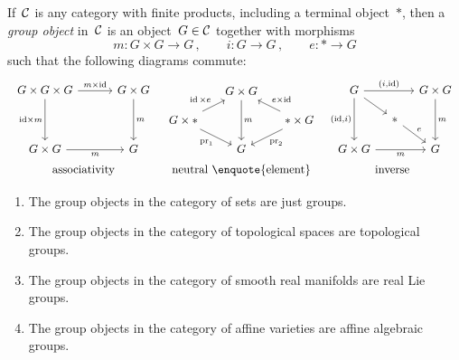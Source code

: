 \begin{remark}
  If~$\mathcal{C}$ is any category with finite products, including a terminal object~$\ast$, then a \emph{group object} in~$\mathcal{C}$ is an object~$G \in \mathcal{C}$ together with morphisms
  \[
    m \colon G \times G \to G \,,
    \qquad
    i \colon G \to G \,,
    \qquad
    e \colon \ast \to G
  \]
  such that the following diagrams commute:
  \[
    \renewcommand{\arraystretch}{1.5}
    \renewcommand{\arraycolsep}{4pt}
    \begin{array}{ccc}
        \begin{tikzcd}[row sep = 36pt, column sep = 30pt]
            G \times G \times G
            \arrow{r}[above]{m \times {\id}}
            \arrow{d}[left]{{\id} \times m}
          & G \times G
            \arrow{d}[right]{m}
          \\
            G \times G
            \arrow{r}[below]{m}
          & G
        \end{tikzcd}
      &
        \begin{tikzcd}[row sep = 10pt, column sep = 15pt]
            {}
          & G \times G
            \arrow{dd}[right]{m}
          & {}
          \\
            G \times *
            \arrow{ur}[above left]{\id \times e}
            \arrow{dr}[below left]{\operatorname{pr}_1}
          & {}
          & * \times G
            \arrow{ul}[above right]{e \times \id}
            \arrow{dl}[below right]{\operatorname{pr}_2}
          \\
            {}
          & G
          & {}
        \end{tikzcd}
      &
        \begin{tikzcd}[row sep = 12pt, column sep = 10pt]
            G
            \arrow{rr}[above]{(i,\id)}
            \arrow{dd}[left]{(\id,i)}
            \arrow{dr}
          & {}
          & G \times G
            \arrow{dd}[right]{m}
          \\
            {}
          & *
            \arrow{dr}{e}
          & {}
          \\
            G \times G
            \arrow{rr}[below]{m}
          & {}
          & G
        \end{tikzcd}
    \\
        \text{associativity}
      & \text{neutral \enquote{element}}
      & \text{inverse}
    \end{array}
  \]
\end{remark}


\begin{example}
  \leavevmode
  \begin{enumerate}
    \item
      The group objects in the category of sets are just groups.
    \item
      The group objects in the category of topological spaces are topological groups.
    \item
      The group objects in the category of smooth real manifolds are real Lie groups.
    \item
      The group objects in the category of affine varieties are affine algebraic groups.
  \end{enumerate}
\end{example}


